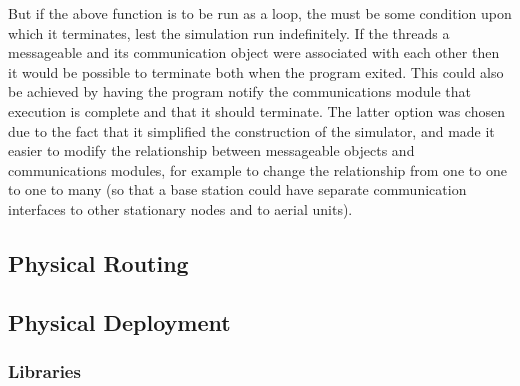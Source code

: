 But if the above function is to be run as a loop, the must be some condition upon which it terminates, lest the simulation run indefinitely. If the threads a messageable and its communication object were associated with each other then it would be possible to terminate both when the program exited. This could also be achieved by having the program notify the communications module that execution is complete and that it should terminate. The latter option was chosen due to the fact that it simplified the construction of the simulator, and made it easier to modify the relationship between messageable objects and communications modules, for example to change the relationship from one to one to one to many (so that a base station could have separate communication interfaces to other stationary nodes and to aerial units).  
		
	\subsection{Physical Routing} 
	\subsection{Physical Deployment}
		\subsubsection{Libraries}